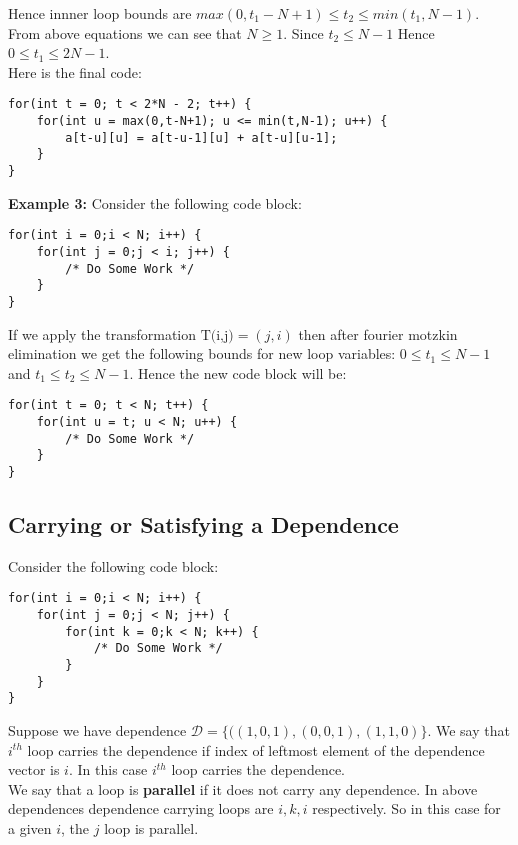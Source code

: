 \documentclass{article}
\begin{document}
Hence innner loop bounds are $\boxed{max(0,t_1-N+1) \leq t_2 \leq min(t_1,N-1)}$. From above equations we can see that $N \geq 1$. Since $t_2 \leq N-1$ Hence $0 \leq t_1 \leq 2N-1$. \\

Here is the final code:
\begin{lstlisting}
for(int t = 0; t < 2*N - 2; t++) {
    for(int u = max(0,t-N+1); u <= min(t,N-1); u++) {
        a[t-u][u] = a[t-u-1][u] + a[t-u][u-1];
    }
}
\end{lstlisting}

\textbf{Example 3: } Consider the following code block:
\begin{lstlisting}
for(int i = 0;i < N; i++) {
    for(int j = 0;j < i; j++) {
        /* Do Some Work */
    }
}
\end{lstlisting}

If we apply the transformation $\text{T(i,j)} = (j,i)$ then after fourier motzkin elimination we get the following bounds for new loop variables: $0 \leq t_1 \leq N-1$ and $t_1 \leq t_2 \leq N-1$. Hence the new code block will be:

\begin{lstlisting}
for(int t = 0; t < N; t++) {
    for(int u = t; u < N; u++) {
        /* Do Some Work */
    }
}
\end{lstlisting}

\subsection*{Carrying or Satisfying a Dependence}
Consider the following code block:
\begin{lstlisting}
for(int i = 0;i < N; i++) {
    for(int j = 0;j < N; j++) {
        for(int k = 0;k < N; k++) {
            /* Do Some Work */
        }
    }
}
\end{lstlisting}
Suppose we have dependence $\mathcal{D} = \{((1,0,1), (0,0,1), (1,1,0) \}$. We say that $i^{th}$ loop carries the dependence if index of leftmost element of the dependence vector is $i$. In this case $i^{th}$ loop carries the dependence. \\

We say that a loop is \textbf{parallel} if it does not carry any dependence. In above dependences dependence carrying loops are $i,k,i$ respectively. So in this case for a given $i$, the $j$ loop is parallel. \\
\end{document}
